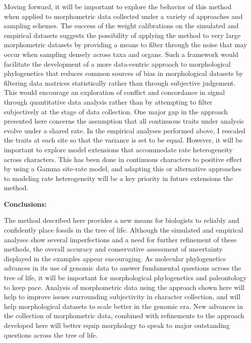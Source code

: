 \documentclass[12pt]{article}
\begin{document}
Moving forward, it will be important to explore the behavior of this
method when applied to morphometric data collected under a variety of
approaches and sampling schemes. The success of the weight calibrations
on the simulated and empirical datasets suggests the possibility of
applying the method to very large morphometric datasets by providing a
means to filter through the noise that may occur when  sampling
densely across taxa and organs. Such a framework would facilitate the
development of a more data-centric approach to morphological
phylogenetics that reduces common sources of bias in morphological 
datasets by filtering data matrices statistically rather than through subjective judgement.
 This would encourage an exploration of conflict and
concordance in signal through quantitative data analysis rather than by
attempting to filter subjectively at the stage of data collection. One major gap in the approach 
presented here concerns the assumption that all continuous traits under
analysis evolve under a shared rate. In the empirical analyses performed 
above, I rescaled the traits at each 
site so that the variance is set to be equal. However, it 
will be important to explore model extensions that accommodate rate
heterogeneity across characters. This has been done in continuous characters
to positive effect by \cite{schraiber2013inferring} using a Gamma site-rate
model, and adapting this or alternative approaches to modeling rate 
heterogeneity \citep{huelsenbeck2007nonparametric} will be a key 
priority in future extensions the method.


\noindent\textbf{Conclusions:}

The method described here provides a new means for biologists to
reliably and confidently place fossils in the tree of life. Although the
simulated and empirical analyses show several imperfections and a need
for further refinement of these methods, the overall accuracy and
conservative assessment of uncertainty displayed in the examples appear
encouraging. As molecular phylogenetics advances in its use of genomic
data to answer fundamental questions across the tree of life, it will be
important for morphological phylogenetics and paleontology to keep pace.
Analysis of morphometric data using the approach shown here will help to
improve issues surrounding subjectivity in character collection, and
will help morphological datasets to scale better in the genomic era. New
advances in the collection of morphometric data, combined with
refinements to the approach developed here will better equip morphology
to speak to major outstanding questions across the tree of life.
\end{document}
